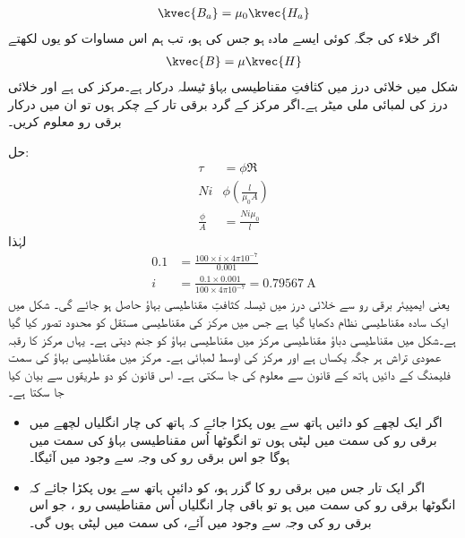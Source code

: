 \begin{align}
\kvec{B_a}=\mu_0 \kvec{H_a}
\end{align}
اگر خلاء کی جگہ کوئی ایسے مادہ ہو جس کی ہو، تب ہم اس مساوات کو یوں لکھتے
\begin{align}
\kvec{B}=\mu \kvec{H}
\end{align}
%
شکل  میں خلائی درز میں کثافتِ مقناطیسی بہاؤ  ٹیسلہ درکار ہے۔مرکز کی   ہے اور خلائی درز کی لمبائی  ملی میٹر ہے۔اگر  مرکز کے گرد برقی تار کے  چکر ہوں تو ان میں درکار برقی رو معلوم کریں۔

حل:
\begin{align*}
\tau&=\phi \Re\\
N i & \phi \left(\frac{l}{\mu_0 A} \right)\\
\frac{\phi}{A}&=\frac{ N i \mu_0}{l}
\end{align*}
لہٰذا
\begin{align*}
0.1&=\frac{100 \times i \times 4 \pi  10^{-7}}{0.001}\\
i&=\frac{0.1 \times 0.001}{100 \times 4 \pi  10^{-7}}=\SI{0.79567}{\ampere}
\end{align*}
یعنی  ایمپیئر برقی رو سے خلائی درز میں  ٹیسلہ کثافتِ مقناطیسی بہاؤ حاصل ہو جائے گی۔
%
شکل  میں ایک سادہ مقناطیسی نظام دکھایا گیا ہے جس میں مرکز کی مقناطیسی مستقل کو محدود تصور کیا گیا ہے۔شکل میں مقناطیسی دباؤ   مقناطیسی مرکز میں مقناطیسی بہاؤ  کو جنم دیتی ہے۔ یہاں مرکز کا رقبہ عمودی تراش   ہر جگہ یکساں ہے اور مرکز  کی اوسط لمبائی  ہے۔ مرکز میں مقناطیسی بہاؤ  کی سمت فلیمنگ کے دائیں ہاتھ کے قانون  سے معلوم کی جا سکتی ہے۔  اس قانون کو دو طریقوں سے بیان کیا جا سکتا ہے۔
\begin{itemize}
\item
اگر ایک لچھے کو دائیں ہاتھ سے یوں پکڑا  جائے کہ ہاتھ کی چار انگلیاں لچھے میں برقی رو کی سمت میں لپٹی  ہوں تو انگوٹھا اُس مقناطیسی بہاؤ کی سمت میں ہوگا جو اس برقی رو کی وجہ سے وجود میں آئیگا۔
\item
اگر ایک تار جس میں برقی رو کا گزر ہو، کو دائیں ہاتھ سے یوں پکڑا جائے کہ انگوٹھا  برقی رو  کی سمت میں ہو تو باقی چار انگلیاں اُس مقناطیسی  رو ، جو اس برقی رو کی وجہ سے وجود میں آئے،  کی سمت میں لپٹی ہوں گی۔
\end{itemize}


